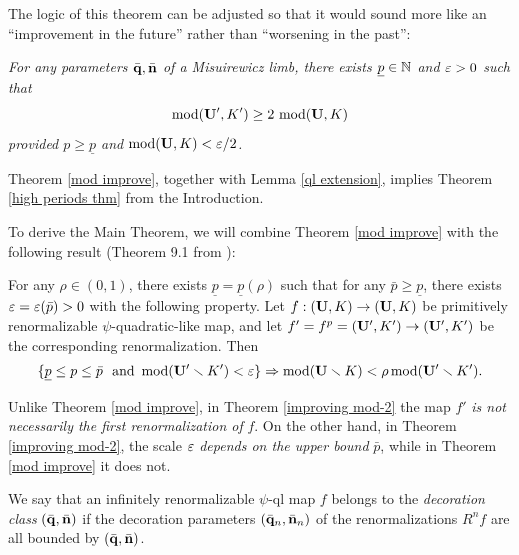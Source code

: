 




\begin{rem}  The logic of this theorem can be adjusted so that it would sound more
like an ``improvement in the future'' rather than ``worsening in the past'':

{\it  For any parameters $\bar{{\mathbf{q}}}, \bar{{\mathbf{n}}}$ of a Misuirewicz limb,
 there exists  $\underline p \in {\Bbb N}$ and ${\varepsilon}>0$ such that
$$
    \operatorname{mod}({\mathbf{U}}', K') \geq   2\,  \operatorname{mod} ({\mathbf{U}}, K)
$$
provided  $p\geq \underline p$ and $\operatorname{mod} ({\mathbf{U}}, K) < {\varepsilon}/2$.}
\end{rem}


\msk
  Theorem \ref{mod improve},
together with Lemma \ref{ql extension},
implies Theorem \ref{high periods thm} from the Introduction.

To derive the Main Theorem, we will combine Theorem \ref{mod improve}
with the following result  (Theorem 9.1 from \cite{K}):

\begin{thm}\label{improving mod-2}
For any $\rho\in (0,1)$, there exists $\underline p=\underline p (\rho)$
such that for any $\bar p\geq \underline p$, there exists ${\varepsilon}={\varepsilon}(\bar p)>0 $ with the following property.
Let $f: ({\mathbf{U}},K)\to ({\mathbf{U}},K)$ be primitively renormalizable $\psi$-quadratic-like map,
and let $f'=f^p = ({\mathbf{U}}',K') \rightarrow ({\mathbf{U}}',K')$ be the corresponding renormalization.
Then
$$
   \{\underline p\leq p\leq \bar p\ \ \mathrm{and}\ \mod(\BU'\sm K') < \eps\}   \imply \mod(\BU\sm K) < \rho \mod(\BU'\sm K').
$$
\end{thm}

\begin{rem}
  Unlike Theorem \ref{mod improve}, in Theorem \ref{improving mod-2} the map
$f'$  {\it is not necessarily the first renormalization of} $f$.
On the other hand, in Theorem  \ref{improving mod-2},
the scale ${\varepsilon}$ {\it depends on the upper bound} $\bar p$,
while in Theorem \ref{mod improve} it does not.
\end{rem}


We say that an infinitely renormalizable $\psi$-ql map $f$
belongs to the {\it decoration class} $(\bar{{\mathbf{q}}}, \bar{{\mathbf{n}}})$ if the decoration parameters $(\bar{{\mathbf{q}}}_n, \bar{{\mathbf{n}}}_n)$
of the renormalizations $R^n f$ are all bounded by $(\bar{{\mathbf{q}}}, \bar{{\mathbf{n}}})$.

